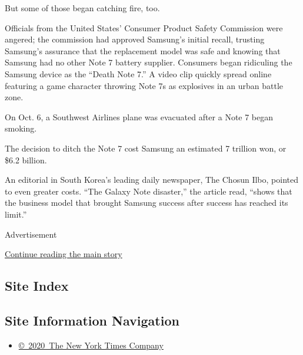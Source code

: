 But some of those began catching fire, too.

Officials from the United States' Consumer Product Safety Commission
were angered; the commission had approved Samsung's initial recall,
trusting Samsung's assurance that the replacement model was safe and
knowing that Samsung had no other Note 7 battery supplier. Consumers
began ridiculing the Samsung device as the ``Death Note 7.'' A video
clip quickly spread online featuring a game character throwing Note 7s
as explosives in an urban battle zone.

On Oct. 6, a Southwest Airlines plane was evacuated after a Note 7 began
smoking.

The decision to ditch the Note 7 cost Samsung an estimated 7 trillion
won, or \$6.2 billion.

An editorial in South Korea's leading daily newspaper, The Chosun Ilbo,
pointed to even greater costs. ``The Galaxy Note disaster,'' the article
read, ``shows that the business model that brought Samsung success after
success has reached its limit.''

Advertisement

\protect\hyperlink{after-bottom}{Continue reading the main story}

\hypertarget{site-index}{%
\subsection{Site Index}\label{site-index}}

\hypertarget{site-information-navigation}{%
\subsection{Site Information
Navigation}\label{site-information-navigation}}

\begin{itemize}
\tightlist
\item
  \href{https://help.nytimes.com/hc/en-us/articles/115014792127-Copyright-notice}{©~2020~The
  New York Times Company}
\end{itemize}

